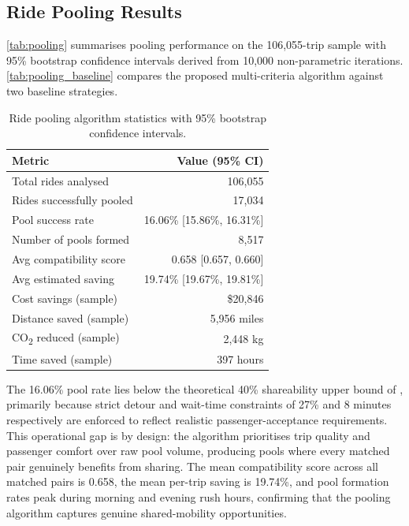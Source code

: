 \documentclass[a4paper,fleqn]{cas-dc}
\begin{document}
\subsection{Ride Pooling Results}

\autoref{tab:pooling} summarises pooling performance on the 106,055-trip sample with 95\% bootstrap confidence intervals derived from 10,000 non-parametric iterations.  \autoref{tab:pooling_baseline} compares the proposed multi-criteria algorithm against two baseline strategies.

\begin{table}[t]
\centering
\caption{Ride pooling algorithm statistics with 95\% bootstrap confidence intervals.\label{tab:pooling}}
\begin{tabularx}{\columnwidth}{>{\raggedright\arraybackslash}X r}
\toprule
\textbf{Metric} & \textbf{Value (95\% CI)} \\
\toprule
Total rides analysed      & 106,055 \\
Rides successfully pooled & 17,034 \\
Pool success rate         & 16.06\% [15.86\%, 16.31\%] \\
Number of pools formed    & 8,517 \\
Avg compatibility score   & 0.658 [0.657, 0.660] \\
Avg estimated saving      & 19.74\% [19.67\%, 19.81\%] \\
Cost savings (sample)     & \$20,846 \\
Distance saved (sample)   & 5,956 miles \\
CO\textsubscript{2} reduced (sample) & 2,448 kg \\
Time saved (sample)       & 397 hours \\
\bottomrule
\end{tabularx}
\end{table}

The 16.06\% pool rate lies below the theoretical 40\% shareability upper bound of \cite{santi2014quantifying}, primarily because strict detour and wait-time constraints of 27\% and 8 minutes respectively are enforced to reflect realistic passenger-acceptance requirements.  This operational gap is by design: the algorithm prioritises trip quality and passenger comfort over raw pool volume, producing pools where every matched pair genuinely benefits from sharing.  The mean compatibility score across all matched pairs is 0.658, the mean per-trip saving is 19.74\%, and pool formation rates peak during morning and evening rush hours, confirming that the pooling algorithm captures genuine shared-mobility opportunities.
\end{document}

